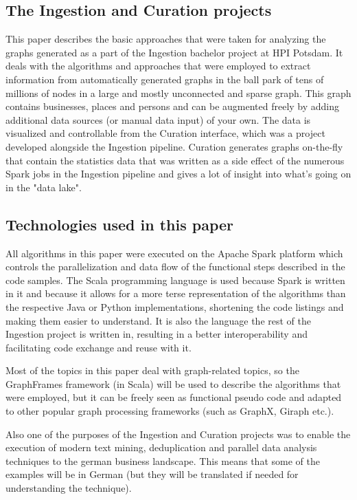 \documentclass[
        a4paper,     %
        titlepage,   %
        oneside,     %
        parskip      %
]{scrartcl}          %
\begin{document}
    \subsection{The Ingestion and Curation projects}
    This paper describes the basic approaches that were taken for analyzing the
    graphs generated as a part of the Ingestion bachelor project at HPI Potsdam.
    It deals with the algorithms and approaches that were employed to extract
    information from automatically generated graphs in the ball park of
    tens of millions of nodes in a large and mostly unconnected and sparse graph.
    This graph contains businesses, places and persons and can be augmented freely by adding
    additional data sources (or manual data input) of your own. The data is visualized and controllable from the
    Curation interface, which was a project developed alongside the Ingestion pipeline.
    Curation generates graphs on-the-fly that contain the statistics data that was written
    as a side effect of the numerous Spark jobs in the Ingestion pipeline and gives
    a lot of insight into what's going on in the "data lake".

    \subsection{Technologies used in this paper}
    All algorithms in this paper were executed on the Apache Spark platform which
    controls the parallelization and data flow of the functional steps described
    in the code samples. The Scala programming language is used because Spark is
    written in it and because it allows for a more terse representation of the
    algorithms than the respective Java or Python implementations, shortening
    the code listings and making them easier to understand. It is also the language
    the rest of the Ingestion project is written in, resulting in a better interoperability
    and facilitating code exchange and reuse with it.

    Most of the topics in this paper deal with graph-related topics, so the GraphFrames framework
    (in Scala) will be used to describe the algorithms that were employed,
    but it can be freely seen as functional pseudo code and adapted to other popular
    graph processing frameworks (such as GraphX, Giraph etc.).

    Also one of the purposes of the Ingestion and Curation projects was to enable
    the execution of modern text mining, deduplication and parallel data analysis techniques
    to the german business landscape. This means that some of the examples will be
    in German (but they will be translated if needed for understanding the technique).
\end{document}
